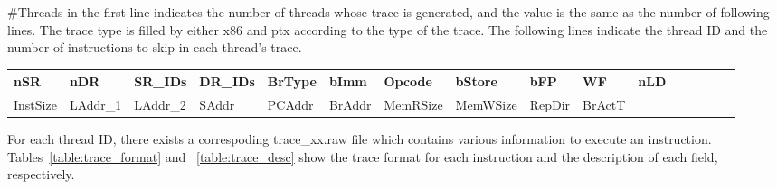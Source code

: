\#Threads in the first line indicates the number of threads whose trace is 
generated, and the value is the same as the number of following lines. The trace
type is filled by either x86 and ptx according to the type of the trace. The following
lines indicate the thread ID and the number of instructions to skip in each thread's trace.

\begin{table*}[htb]
\begin{footnotesize}
\begin{center}
\caption{MacSim trace format.}
\label{table:trace_format}
\begin{tabular}{|l|l|l|l|l|l|l|l|l|l|l|l|l|l|l|l|} 
\hline
nSR & nDR & SR\_IDs & DR\_IDs & BrType & bImm & Opcode & bStore & bFP & WF & nLD  \\ \hline \hline
InstSize & LAddr\_1 & LAddr\_2 & SAddr & PCAddr & BrAddr & MemRSize & MemWSize & RepDir & BrActT & \\ \hline
\end{tabular}
\end{center}
\end{footnotesize}
\end{table*}

For each thread ID, there exists a correspoding trace\_xx.raw file which
contains various information to execute an instruction.
Tables~\ref{table:trace_format} and ~\ref{table:trace_desc} show the trace
format for each instruction and the description of each field, respectively.

